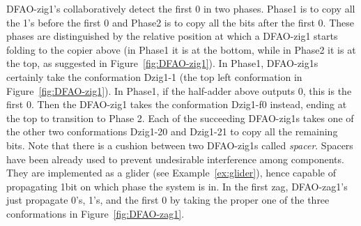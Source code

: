 DFAO-zig1's collaboratively detect the first 0 in two phases.
Phase1 is to copy all the 1's before the first 0 and Phase2 is to copy all the bits after the first 0.
These phases are distinguished by the relative position at which a DFAO-zig1 starts folding to the copier above (in Phase1 it is at the bottom, while in Phase2 it is at the top, as suggested in Figure~\ref{fig:DFAO-zig1}).
In Phase1, DFAO-zig1s certainly take the conformation Dzig1-1 (the top left conformation in Figure~\ref{fig:DFAO-zig1}).
In Phase1, if the half-adder above outputs 0, this is the first 0. 
Then the DFAO-zig1 takes the conformation Dzig1-f0 instead, ending at the top to transition to Phase 2.
Each of the succeeding DFAO-zig1s takes one of the other two conformations Dzig1-20 and Dzig1-21 to copy all the remaining bits. 
Note that there is a cushion between two DFAO-zig1s called \textit{spacer}.
Spacers have been already used to prevent undesirable interference among components.
They are implemented as a glider (see Example~\ref{ex:glider}), hence capable of propagating 1bit on which phase the system is in.
In the first zag, DFAO-zag1's just propagate 0's, 1's, and the first 0 by taking the proper one of the three conformations in Figure~\ref{fig:DFAO-zag1}.

